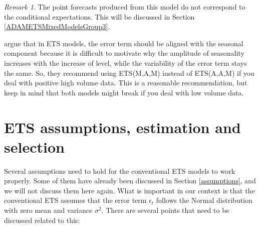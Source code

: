 \documentclass[]{book}
\theoremstyle{definition}
\theoremstyle{definition}
\theoremstyle{definition}
\theoremstyle{definition}
\theoremstyle{remark}
\newtheorem*{remark}{Remark}
\begin{document}
\begin{remark}
The point forecasts produced from this model do not correspond to the conditional expectations. This will be discussed in Section \ref{ADAMETSMixedModelsGroup3}.
\end{remark}

\citet{Hyndman2008b} argue that in ETS models, the error term should be aligned with the seasonal component because it is difficult to motivate why the amplitude of seasonality increases with the increase of level, while the variability of the error term stays the same. So, they recommend using ETS(M,A,M) instead of ETS(A,A,M) if you deal with positive high volume data. This is a reasonable recommendation, but keep in mind that both models might break if you deal with low volume data.

\hypertarget{ets-assumptions-estimation-and-selection}{%
\section{ETS assumptions, estimation and selection}\label{ets-assumptions-estimation-and-selection}}

Several assumptions need to hold for the conventional ETS models to work properly. Some of them have already been discussed in Section \ref{assumptions}, and we will not discuss them here again. What is important in our context is that the conventional ETS assumes that the error term \(\epsilon_t\) follows the Normal distribution with zero mean and variance \(\sigma^2\). There are several points that need to be discussed related to this:
\end{document}
